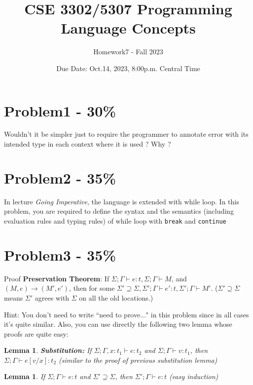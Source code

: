 \documentclass{article}
\newtheorem{lemma}[thm]{Lemma}
\begin{document}
\title{CSE 3302/5307 Programming Language Concepts}
\author{Homework7 - Fall 2023}
\date{Due Date: Oct.14, 2023, 8:00p.m. Central Time}
\maketitle
\thispagestyle{fancy}


\section*{Problem1 - 30\%}

Wouldn't it be simpler just to require the programmer to annotate error with its intended type in each context where it is used ? Why ?


\section*{Problem2 - 35\%}

In lecture \emph{Going Imperative}, the language is extended with while loop.
In this problem, you are required to define the syntax and the semantics
(including evaluation rules and typing rules) of while loop with \texttt{break} and \texttt{continue}


\section*{Problem3 - 35\%}

Proof \textbf{Preservation Theorem}: If $\Sigma;\Gamma \vdash e:t, \Sigma;\Gamma \vdash M$, and $(M,e)\rightarrow(M',e')$, then for some $\Sigma' \supseteq \Sigma, \Sigma';\Gamma \vdash e':t, \Sigma';\Gamma \vdash M'$. ($\Sigma' \supseteq \Sigma$ means $\Sigma'$ agrees with $\Sigma$ on all the old locations.)
	
Hint: You don't need to write ``need to prove..." in this problem since in all cases it's quite similar. Also, you can use directly the following two lemma whose proofs are quite easy:
\begin{lemma}

\textbf{Substitution:} If $\Sigma;\Gamma, x:t_1 \vdash e:t_2$ and $\Sigma;\Gamma \vdash v:t_1$, then $\Sigma;\Gamma \vdash e[v/x]:t_2$
(similar to the proof of previous substitution lemma)
\end{lemma}

\begin{lemma}
If $\Sigma;\Gamma \vdash e:t$ and $\Sigma' \supseteq \Sigma$, then $\Sigma';\Gamma \vdash e:t$
(easy induction)
\end{lemma}
\end{document}
